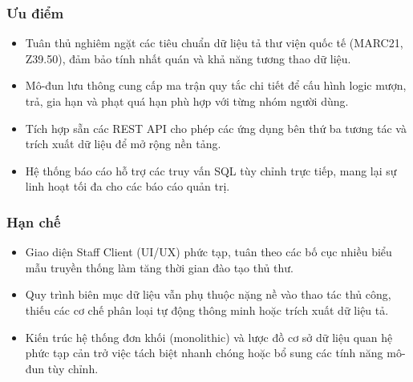 \subsubsection{Ưu điểm}
\begin{itemize}
\item Tuân thủ nghiêm ngặt các tiêu chuẩn dữ liệu tả thư viện quốc tế (MARC21, Z39.50), đảm bảo tính nhất quán và khả năng tương thao dữ liệu.
\item Mô-đun lưu thông cung cấp ma trận quy tắc chi tiết để cấu hình logic mượn, trả, gia hạn và phạt quá hạn phù hợp với từng nhóm người dùng.
\item Tích hợp sẵn các REST API cho phép các ứng dụng bên thứ ba tương tác và trích xuất dữ liệu để mở rộng nền tảng.
\item Hệ thống báo cáo hỗ trợ các truy vấn SQL tùy chỉnh trực tiếp, mang lại sự linh hoạt tối đa cho các báo cáo quản trị.
\end{itemize}

\subsubsection{Hạn chế}
\begin{itemize}
\item Giao diện Staff Client (UI/UX) phức tạp, tuân theo các bố cục nhiều biểu mẫu truyền thống làm tăng thời gian đào tạo thủ thư.
\item Quy trình biên mục dữ liệu vẫn phụ thuộc nặng nề vào thao tác thủ công, thiếu các cơ chế phân loại tự động thông minh hoặc trích xuất dữ liệu tả.
\item Kiến trúc hệ thống đơn khối (monolithic) và lược đồ cơ sở dữ liệu quan hệ phức tạp cản trở việc tách biệt nhanh chóng hoặc bổ sung các tính năng mô-đun tùy chỉnh.
\end{itemize}
